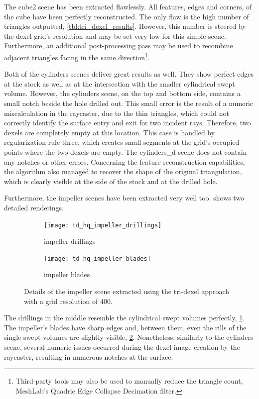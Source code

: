 %
The cube2 scene has been extracted flawlessly.
All features, \ie edges and corners, of the cube have been perfectly reconstructed.
The only flaw is the high number of triangles outputted, \cf \cref{tbl:tri_dexel_results}.
However, this number is steered by the dexel grid's resolution and may be set very low for this simple scene.
Furthermore, an additional post-processing pass may be used to recombine adjacent triangles facing in the same direction\footnote{Third-party tools may also be used to manually reduce the triangle count, \eg MeshLab's Quadric Edge Collapse Decimation filter.}.

Both of the cylinders scenes deliver great results as well.
They show perfect edges at the stock as well as at the intersection with the smaller cylindrical swept volume.
However, the cylinders scene, on the top and bottom side, contains a small notch beside the hole drilled out.
This small error is the result of a numeric miscalculation in the raycaster, due to the thin triangles, which could not correctly identify the surface entry and exit for two incident rays.
Therefore, two dexels are completely empty at this location.
This case is handled by regularization rule three, which creates small segments at the grid's occupied points where the two dexels are empty.
The cylinders\_d scene does not contain any notches or other errors.
Concerning the feature reconstruction capabilities, the algorithm also managed to recover the shape of the original triangulation, which is clearly visible at the side of the stock and at the drilled hole.

Furthermore, the impeller scenes have been extracted very well too.
 shows two detailed renderings.
%
\begin{figure}
	\centering
	\begin{subfigure}[b]{0.49\textwidth}
		\centering
		\texttt{[image: td\_hq\_impeller\_drillings]}
		\caption{impeller drillings}
		\label{fig:td_hq_impeller_drillings}
	\end{subfigure}
	\begin{subfigure}[b]{0.49\textwidth}
		\centering
		\texttt{[image: td\_hq\_impeller\_blades]}
		\caption{impeller blades}
		\label{fig:td_hq_impeller_blades}
	\end{subfigure}
	\caption{
		Details of the impeller scene extracted using the tri-dexel approach with a grid resolution of 400.
	}
	\label{fig:td_hq_impeller_details}
\end{figure}
%
The drillings in the middle resemble the cylindrical swept volumes perfectly, \cf \cref{fig:td_hq_impeller_drillings}.
The impeller's blades have sharp edges and, between them, even the rills of the single swept volumes are slightly visible, \cf \cref{fig:td_hq_impeller_blades}.
Nonetheless, similarly to the cylinders scene, several numeric issues occurred during the dexel image creation by the raycaster, resulting in numerous notches at the surface.

